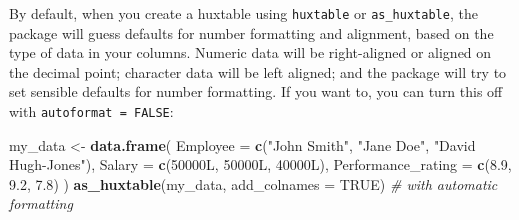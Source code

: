 \documentclass[]{article}
\newenvironment{Shaded}{\begin{snugshade}}{\end{snugshade}}
\newcommand{\KeywordTok}[1]{\textcolor[rgb]{0.13,0.29,0.53}{\textbf{#1}}}
\newcommand{\DataTypeTok}[1]{\textcolor[rgb]{0.13,0.29,0.53}{#1}}
\newcommand{\FloatTok}[1]{\textcolor[rgb]{0.00,0.00,0.81}{#1}}
\newcommand{\StringTok}[1]{\textcolor[rgb]{0.31,0.60,0.02}{#1}}
\newcommand{\CommentTok}[1]{\textcolor[rgb]{0.56,0.35,0.01}{\textit{#1}}}
\newcommand{\OtherTok}[1]{\textcolor[rgb]{0.56,0.35,0.01}{#1}}
\newcommand{\NormalTok}[1]{#1}
\begin{document}
By default, when you create a huxtable using \texttt{huxtable} or
\texttt{as\_huxtable}, the package will guess defaults for number
formatting and alignment, based on the type of data in your columns.
Numeric data will be right-aligned or aligned on the decimal point;
character data will be left aligned; and the package will try to set
sensible defaults for number formatting. If you want to, you can turn
this off with \texttt{autoformat\ =\ FALSE}:

\begin{Shaded}
\begin{Highlighting}[]
\NormalTok{my_data <-}\StringTok{ }\KeywordTok{data.frame}\NormalTok{(}
        \DataTypeTok{Employee           =} \KeywordTok{c}\NormalTok{(}\StringTok{"John Smith"}\NormalTok{, }\StringTok{"Jane Doe"}\NormalTok{, }\StringTok{"David Hugh-Jones"}\NormalTok{), }
        \DataTypeTok{Salary             =} \KeywordTok{c}\NormalTok{(50000L, 50000L, 40000L),}
        \DataTypeTok{Performance_rating =} \KeywordTok{c}\NormalTok{(}\FloatTok{8.9}\NormalTok{, }\FloatTok{9.2}\NormalTok{, }\FloatTok{7.8}\NormalTok{)  }
\NormalTok{      )}
\KeywordTok{as_huxtable}\NormalTok{(my_data, }\DataTypeTok{add_colnames =} \OtherTok{TRUE}\NormalTok{) }\CommentTok{# with automatic formatting}
\end{Highlighting}
\end{Shaded}
\end{document}
